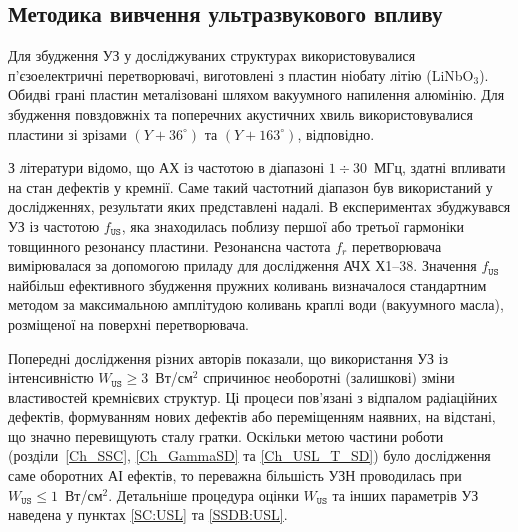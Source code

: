 \subsection{Методика вивчення ультразвукового впливу}

Для збудження УЗ у досліджуваних структурах використовувалися п'єзоелектричні перетворювачі,
виготовлені з пластин ніобату літію (LiNbO$_3$).
Обидві грані пластин металізовані шляхом вакуумного напилення алюмінію.
Для збудження повздовжніх та поперечних акустичних хвиль використовувалися пластини зі зрізами $(Y\!+\!36^\circ)$ та $(Y\!+\!163^\circ)$, відповідно.

З літератури \cite{Ostapenko1995,Davletova2008,Davletova2009,Pashaev2014r} відомо, що АХ із частотою в діапазоні $1\div30$~МГц, здатні впливати на стан дефектів у кремнії.
Саме такий частотний діапазон був використаний у дослідженнях, результати яких представлені надалі.
В експериментах збуджувався УЗ із частотою $f_\mathtt{US}$, яка знаходилась поблизу першої або третьої гармоніки товщинного резонансу пластини.
Резонансна частота $f_r$ перетворювача вимірювалася за допомогою приладу для дослідження АЧХ Х1--38.
Значення $f_\mathtt{US}$ найбільш ефективного збудження пружних коливань визначалося стандартним методом за максимальною амплітудою коливань краплі води (вакуумного масла), розміщеної на поверхні перетворювача.

Попередні дослідження різних авторів \cite{Davletova2008,Davletova2009,Pashaev2014r,Vlasov2009r} показали, що використання УЗ
із інтенсивністю $W_\mathtt{US}\geq3$~Вт/см$^2$ спричинює необоротні (залишкові) зміни властивостей кремнієвих структур.
Ці процеси пов'язані з відпалом радіаційних дефектів, формуванням нових дефектів або переміщенням наявних, на відстані, що значно перевищують сталу гратки.
Оскільки метою частини роботи (розділи~\ref{Ch_SSC}, \ref{Ch_GammaSD} та \ref{Ch_USL_T_SD}) було дослідження саме оборотних АІ ефектів,
то переважна більшість УЗН проводилась при $W_\mathtt{US} \leq 1$~Вт/см$^2$.
Детальніше процедура оцінки $W_\mathtt{US}$ та інших параметрів УЗ наведена у пунктах \ref{SC:USL} та \ref{SSDB:USL}.



